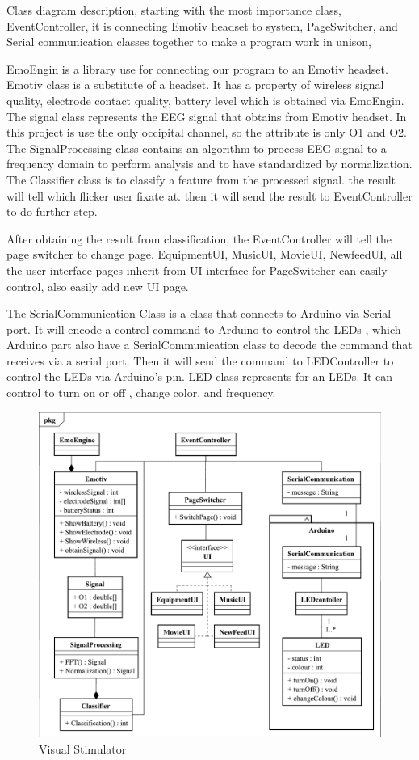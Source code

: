\hspace{1.5cm}Class diagram description, starting with the most importance class, EventController, it is connecting Emotiv headset to system, PageSwitcher, and Serial communication classes together to make a program work in unison,

EmoEngin is a library use for connecting our program to an Emotiv headset. Emotiv class is a substitute of a headset. It has a property of wireless signal quality, electrode contact quality, battery level which is obtained via EmoEngin. The signal class represents the EEG signal that obtains from Emotiv headset. In this project is use the only occipital channel, so the attribute is only O1 and O2. The SignalProcessing class contains an algorithm to process EEG signal to a frequency domain to perform analysis and to have standardized by normalization. The Classifier class is to classify a feature from the processed signal. the result will tell which flicker user fixate at. then it will send the result to EventController to do further step.

After obtaining the result from classification, the EventController will tell the page switcher to change page. EquipmentUI, MusicUI, MovieUI, NewfeedUI, all the user interface pages inherit from UI interface for PageSwitcher can easily control, also easily add new UI page.

The SerialCommunication Class is a class that connects to Arduino via Serial port. It will encode a control command to Arduino to control the LEDs , which Arduino part also have a SerialCommunication class to decode the command that receives via a serial port. Then it will send the command to LEDController to control the LEDs via Arduino's pin. LED class represents for an LEDs. It can control to turn on or off , change color, and frequency.\\
\begin{figure}[ht]
	\centering
	\includegraphics[width=\textwidth]{chapter5/Class.pdf}
	\caption{Visual Stimulator}
\end{figure}